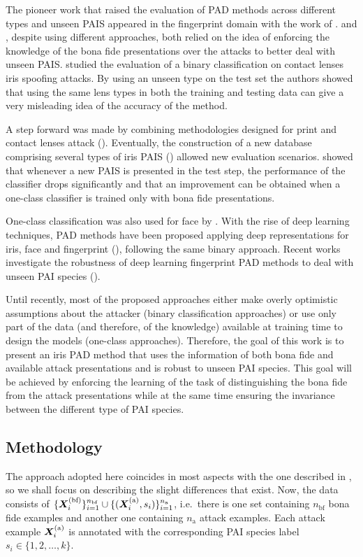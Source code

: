 The pioneer work that raised the evaluation of PAD methods across different types and unseen PAIS appeared in the fingerprint domain with the work of \citet{marasco2011robustness}. \citet{rattani2015openset} and \citet{sequeira2015fingerprint}, despite using different approaches, both relied on the idea of enforcing the knowledge of the bona fide presentations over the attacks to better deal with unseen PAIS. \citet{bowyer2014cosmetic} studied the evaluation of a binary classification on contact lenses iris spoofing attacks. By using an unseen type on the test set the authors showed that using the same lens types in both the training and testing data can give a very misleading idea of the accuracy of the method.

A step forward was made by combining methodologies designed for print and contact lenses attack (\citet{sequeira2014ildmma}). Eventually, the construction of a new database comprising several types of iris PAIS (\citet{raghavendra2015VSIA}) allowed new evaluation scenarios. \citet{sequeira2016realistic} showed that whenever a new PAIS is presented in the test step, the performance of the classifier drops significantly and that an improvement can be obtained when a one-class classifier is trained only with bona fide presentations.

One-class classification was also used for face by \citet{kittler2017faceanomaly}. With the rise of deep learning techniques, PAD methods have been proposed applying deep representations for iris, face and fingerprint (\citet{menotti2015deep,pinto2018counteracting}), following the same binary approach. Recent works investigate the robustness of deep learning fingerprint PAD methods to deal with unseen PAI species (\citet{tolosana2018towards}).

Until recently, most of the proposed approaches either make overly optimistic assumptions about the attacker (binary classification approaches) or use only part of the data (and therefore, of the knowledge) available at training time to design the models (one-class approaches). Therefore, the goal of this work is to present an iris PAD method that uses the information of both bona fide and available attack presentations and is robust to unseen PAI species. This goal will be achieved by enforcing the learning of the task of distinguishing the bona fide from the attack presentations while at the same time ensuring the invariance between the different type of PAI species.

\subsection{Methodology}
\label{sec:adv_iris_attack_method}
The approach adopted here coincides in most aspects with the one described in , so we shall focus on describing the slight differences that exist. Now, the data consists of $\{{\bm{X}}^{(\text{bf})}_i\}_{i=1}^{n_{\text{bf}}} \cup \{({\bm{X}}^{(\text{a})}_i,s_i)\}_{i=1}^{n_{\text{a}}}$, i.e.\ there is one set containing $n_{\text{bf}}$ bona fide examples and another one containing $n_{\text{a}}$ attack examples. Each attack example ${\bm{X}}^{(\text{a})}_i$ is annotated with the corresponding PAI species label $s_i \in \{1,2,\dots,k\}$.


